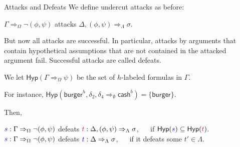 \documentclass[aspectratio=169]{beamer}
\begin{document}
\def\Hyp{\mathsf{Hyp}}
\begin{frame}{Attacks and Defeats}
    We define undercut attacks as before: 
    \begin{center}$\Gamma \Rightarrow_\Omega \neg(\phi,\psi)$ \alert{attacks} $\Delta, (\phi,\psi) \Rightarrow_{\Lambda} \sigma$.
    \end{center}

    But now all attacks are successful. In particular, attacks by arguments that contain hypothetical assumptions that are not contained in the attacked argument fail. Successful attacks are called \alert{defeats}. 
    
    We let \alert{$\Hyp(\Gamma \Rightarrow_\Omega \psi)$} be the set of $h$-labeled formulas in $\Gamma$.

    For instance, $\Hyp(\mathsf{burger}^h, \delta_2, \delta_4 \Rightarrow_\emptyset \mathsf{cash}^b) = \{ \mathsf{burger} \}$.

    Then, 
    \begin{center} ${\color{blue}s} : \Gamma \Rightarrow_\Omega \neg(\phi,\psi)$ \alert{defeats} ${\color{red}t} : \Delta, (\phi,\psi) \Rightarrow_\Lambda \sigma$, ~~ if $\Hyp({\color{blue}s}) \subseteq \Hyp({\color{red}t})$. \\
    ${\color{blue}s} : \Gamma \Rightarrow_\Omega \neg(\phi,\psi)$ \alert{defeats} ${\color{blue} t}: \Delta \Rightarrow_\Lambda \sigma$, ~~ if it defeats some $t' \in \Lambda$.
    \end{center}
\end{frame}

\end{document}
